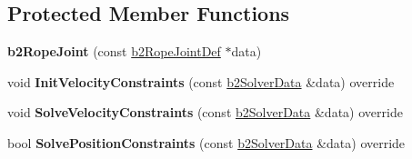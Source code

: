 \subsection*{Protected Member Functions}
\begin{DoxyCompactItemize}
\item 
\mbox{\label{classb2RopeJoint_a3f69f238616d8dc622d9448f81e14e53}} 
{\bfseries b2\+Rope\+Joint} (const \mbox{\hyperlink{structb2RopeJointDef}{b2\+Rope\+Joint\+Def}} $\ast$data)
\item 
\mbox{\label{classb2RopeJoint_a8a9bd57a12aaf38b529ae626e714e1e8}} 
void {\bfseries Init\+Velocity\+Constraints} (const \mbox{\hyperlink{structb2SolverData}{b2\+Solver\+Data}} \&data) override
\item 
\mbox{\label{classb2RopeJoint_a08bf8f6cffe281a9f58ee469f99bf5b1}} 
void {\bfseries Solve\+Velocity\+Constraints} (const \mbox{\hyperlink{structb2SolverData}{b2\+Solver\+Data}} \&data) override
\item 
\mbox{\label{classb2RopeJoint_a2fcbda6d472c660aa01793c798a8f92e}} 
bool {\bfseries Solve\+Position\+Constraints} (const \mbox{\hyperlink{structb2SolverData}{b2\+Solver\+Data}} \&data) override
\end{DoxyCompactItemize}
